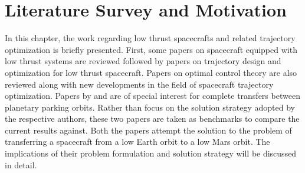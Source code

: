 
\chapter{Literature Survey and Motivation}

\ifpdf
    \graphicspath{{Chapter2/Figs/Raster/}{Chapter2/Figs/PDF/}{Chapter2/Figs/}}
\else
    \graphicspath{{Chapter2/Figs/Vector/}{Chapter2/Figs/}}
\fi
In this chapter, the work regarding low thrust spacecrafts and related trajectory optimization is briefly presented. First, some papers on spacecraft equipped with low thrust systems are reviewed followed by papers on trajectory design and optimization for low thrust spacecraft. Papers on optimal control theory are also reviewed along with new developments in the field of spacecraft trajectory optimization. Papers by \cite{nah_fuel-optimal_2001} and \cite{genta_optimal_2016} are of special interest for complete transfers between planetary parking orbits. Rather than focus on the solution strategy adopted by the respective authors, these two papers are taken as benchmarks to compare the current results against. Both the papers attempt the solution to the problem of transferring a spacecraft from a low Earth orbit to a low Mars orbit. The implications of their problem formulation and solution strategy will be discussed in detail.

